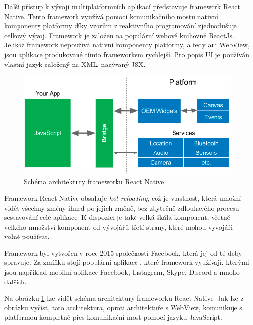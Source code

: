 Další přístup k vývoji multiplatformních aplikací představuje framework
React Native.
Tento framework využívá pomocí komunikačního mostu nativní komponenty platformy
díky vzorům z reaktivního programování zjednodušuje celkový vývoj.
\cite{hackernoon_flutter}
Framework je založen na populární webové knihovně ReactJs.
\cite{dashmagazine_mobile_frameworks}
Jelikož framework nepoužívá nativní komponenty platformy,
a tedy ani WebView,
jsou aplikace produkované tímto frameworkem rychlejší.
Pro popis UI je používán vlastní jazyk založený na XML, nazývaný JSX.

\begin{figure}[ht!]
    \centering
    \includegraphics[width=\linewidth]{assets/technology-research/framework/react_native.png}
    \caption{Schéma architektury frameworku React Native  \cite{hackernoon_flutter}}
    \label{fig:framework_react_native}
\end{figure}

Framework React Native obsahuje \emph{hot reloading},
což je vlastnost,
která umožní vidět všechny změny ihned po jejich změně,
bez zbytečně zdlouhavého procesu sestavování celé aplikace.
K dispozici je také velká škála komponent,
včetně velkého množství komponent od vývojářů třetí strany, 
které mohou vývojáři volně používat.
\cite{dashmagazine_mobile_frameworks}

Framework byl vytvořen v roce 2015 \cite{hackernoon_flutter}
společností Facebook,
která jej od té doby spravuje.
Za zmíňku stojí populární aplikace \cite{react_native},
které framework využívají,
kterými jsou například mobilní aplikace Facebook, Instagram, Skype, Discord
a mnoho dalších.

Na obrázku \ref{fig:framework_react_native} lze vidět schéma architektury
frameworku React Native.
Jak lze z obrázku vyčíst,
tato architektura,
oproti architektuře s WebView,
komunikuje s platformou kompletně přes komunikační most pomocí jazyku
JavaScript.

